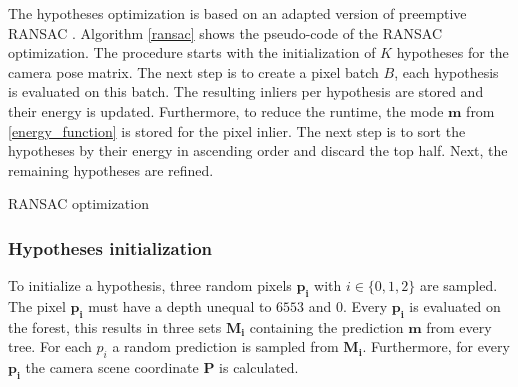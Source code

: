 \documentclass[final]{cvpr}
\begin{document}
The hypotheses optimization is based on an adapted version of preemptive RANSAC \cite{shotton2013}.
Algorithm \autoref{ransac} shows the pseudo-code of the RANSAC optimization.
The procedure starts with the initialization of $K$ hypotheses for the camera pose matrix. 
The next step is to create a pixel batch $B$,
each hypothesis is evaluated on this batch. The resulting inliers per hypothesis  are stored and their energy is 
updated. Furthermore, to reduce the runtime, the mode $\boldsymbol{m}$ from \ref{energy_function} is stored for
the pixel inlier.
The next step is to sort the hypotheses by their energy in ascending order and discard the top half. Next, the remaining hypotheses are refined.

\begin{algorithm}
	\caption{RANSAC optimization}\label{ransac}
\end{algorithm}

\subsubsection{Hypotheses initialization}
To initialize a hypothesis, three random pixels $$ with $i \in \{0,1,2\}$ are sampled. The pixel $$ must have a depth unequal to $6553$ and $0$. Every $$ is evaluated on the forest, this results in three sets 
$$ containing the prediction $$ from every tree. For each $p_{i}$ a random prediction is sampled from $$. Furthermore, for every $$ the camera scene coordinate $$ is calculated.
\end{document}
